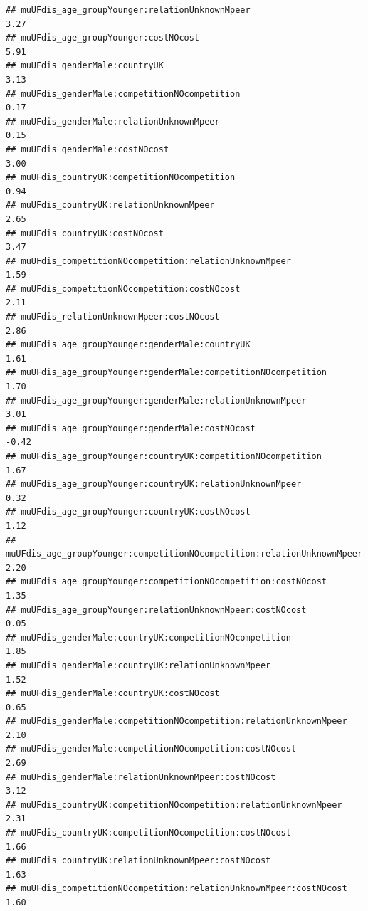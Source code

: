\documentclass[
]{article}
\begin{document}
\begin{verbatim}
## muUFdis_age_groupYounger:relationUnknownMpeer                              3.27
## muUFdis_age_groupYounger:costNOcost                                        5.91
## muUFdis_genderMale:countryUK                                               3.13
## muUFdis_genderMale:competitionNOcompetition                                0.17
## muUFdis_genderMale:relationUnknownMpeer                                    0.15
## muUFdis_genderMale:costNOcost                                              3.00
## muUFdis_countryUK:competitionNOcompetition                                 0.94
## muUFdis_countryUK:relationUnknownMpeer                                     2.65
## muUFdis_countryUK:costNOcost                                               3.47
## muUFdis_competitionNOcompetition:relationUnknownMpeer                      1.59
## muUFdis_competitionNOcompetition:costNOcost                                2.11
## muUFdis_relationUnknownMpeer:costNOcost                                    2.86
## muUFdis_age_groupYounger:genderMale:countryUK                              1.61
## muUFdis_age_groupYounger:genderMale:competitionNOcompetition               1.70
## muUFdis_age_groupYounger:genderMale:relationUnknownMpeer                   3.01
## muUFdis_age_groupYounger:genderMale:costNOcost                            -0.42
## muUFdis_age_groupYounger:countryUK:competitionNOcompetition                1.67
## muUFdis_age_groupYounger:countryUK:relationUnknownMpeer                    0.32
## muUFdis_age_groupYounger:countryUK:costNOcost                              1.12
## muUFdis_age_groupYounger:competitionNOcompetition:relationUnknownMpeer     2.20
## muUFdis_age_groupYounger:competitionNOcompetition:costNOcost               1.35
## muUFdis_age_groupYounger:relationUnknownMpeer:costNOcost                   0.05
## muUFdis_genderMale:countryUK:competitionNOcompetition                      1.85
## muUFdis_genderMale:countryUK:relationUnknownMpeer                          1.52
## muUFdis_genderMale:countryUK:costNOcost                                    0.65
## muUFdis_genderMale:competitionNOcompetition:relationUnknownMpeer           2.10
## muUFdis_genderMale:competitionNOcompetition:costNOcost                     2.69
## muUFdis_genderMale:relationUnknownMpeer:costNOcost                         3.12
## muUFdis_countryUK:competitionNOcompetition:relationUnknownMpeer            2.31
## muUFdis_countryUK:competitionNOcompetition:costNOcost                      1.66
## muUFdis_countryUK:relationUnknownMpeer:costNOcost                          1.63
## muUFdis_competitionNOcompetition:relationUnknownMpeer:costNOcost           1.60

\end{verbatim}
\end{document}
